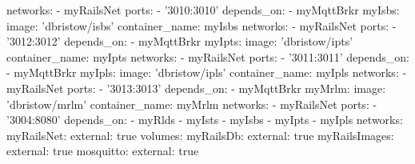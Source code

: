 \begin{fslisting}
    networks:
      - myRailsNet
    ports:
      - '3010:3010'
    depends_on:
      - myMqttBrkr
  myIsbs:
    image: 'dbristow/isbs'
    container_name: myIsbs
    networks:
      - myRailsNet
    ports:
      - '3012:3012'
    depends_on:
      - myMqttBrkr
  myIpts:
    image: 'dbristow/ipts'
    container_name: myIpts
    networks:
      - myRailsNet
    ports:
      - '3011:3011'
    depends_on:
      - myMqttBrkr
  myIpls:
    image: 'dbristow/ipls'
    container_name: myIpls
    networks:
      - myRailsNet
    ports:
      - '3013:3013'
    depends_on:
      - myMqttBrkr
  myMrlm:
    image: 'dbristow/mrlm'
    container_name: myMrlm
    networks:
      - myRailsNet
    ports:
      - '3004:8080'
    depends_on:
      - myRlds
      - myIsts
      - myIsbs
      - myIpts
      - myIpls
networks:
  myRailsNet:
    external: true
volumes:
  myRailsDb:
    external: true
  myRailsImages:
    external: true
  mosquitto:
    external: true
\end{fslisting}
